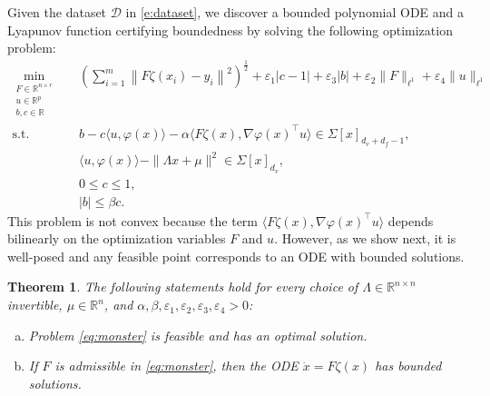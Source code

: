 \documentclass[11pt]{amsart}
\numberwithin{equation}{section}
\theoremstyle{plain}
\newtheorem{theorem}{Theorem}[section]
\theoremstyle{definition}
\theoremstyle{remark}
\newcommand{\R}{\mathbb{R}}
\renewcommand{\vec}[1]{{#1}}
\newcommand{\mat}[1]{{#1}}
\newcommand{\ip}[2]{\langle #1, #2 \rangle}
\begin{document}
Given the dataset $\mathcal{D}$ in \cref{e:dataset}, we discover a bounded polynomial ODE and a Lyapunov function certifying boundedness by solving the following optimization problem:
\begin{align}\label{eq:monster}
        \min_{\substack{
        \mat{F} \in \R^{n \times r}\\
        \vec{u} \in \R^p\\
        b,c \in \R
        }}
        \quad
        & \left(\sum_{i=1}^m \left\| \mat{F} \zeta(x_i) - y_i \right\|^2 \right)^{\frac12} + \varepsilon_1 |c-1| + \varepsilon_3 |b| + \varepsilon_2 \| \mat{F} \|_{\ell^1} 
        +\varepsilon_4 \|u\|_{\ell^1}
        \\ \nonumber
        \text{s.t.} \quad
        &b - c \ip{\vec{u}}{\varphi(\vec{x})} - \alpha \ip{\mat{F} \zeta(\vec{x})}{\nabla \varphi(\vec{x})^\top \vec{u}} \in \Sigma[\vec{x}]_{d_v+d_f-1},
        \\ \nonumber
        &\ip{\vec{u}}{\varphi(\vec{x})}  -  \|\mat{\Lambda} \vec{x} + \vec{\mu}\|^2 \in \Sigma[\vec{x}]_{d_v},
        \\ \nonumber
        &0\leq c \leq 1,
        \\ \nonumber 
        &|b| \leq \beta c.
\end{align}
This problem is not convex because the term $\ip{\mat{F} \zeta(\vec{x})}{\nabla \varphi(\vec{x})^\top \vec{u}}$ depends bilinearly on the optimization variables $\mat{F}$ and $\vec{u}$. However, as we show next, it is well-posed and any feasible point corresponds to an ODE with bounded solutions.
\begin{theorem}\label{th:monster-problem}
    The following statements hold for every choice of $\Lambda\in\R^{n\times n}$ invertible, $\vec{\mu}\in\R^n$, and $\alpha,\beta,\varepsilon_1,\varepsilon_2,\varepsilon_3,\varepsilon_4>0$:
    \begin{enumerate}[a), noitemsep]
        \item Problem \cref{eq:monster} is feasible and has an optimal solution.
        \item If $\mat{F}$ is admissible in \cref{eq:monster}, then the ODE $\dot{x}=\mat{F} \zeta(x)$ has bounded solutions.
    \end{enumerate}
\end{theorem}
\end{document}
